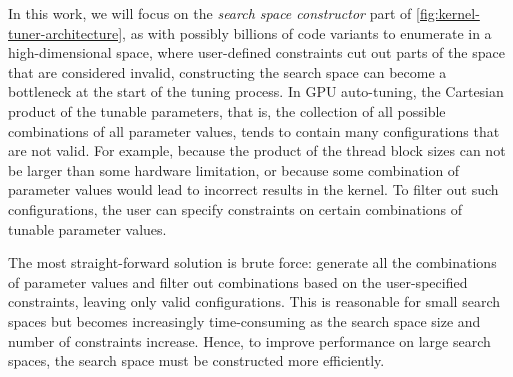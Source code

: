 

In this work, we will focus on the \textit{search space constructor} part of \cref{fig:kernel-tuner-architecture}, as with possibly billions of code variants to enumerate in a high-dimensional space, where user-defined constraints cut out parts of the space that are considered invalid, constructing the search space can become a bottleneck at the start of the tuning process. 
In GPU auto-tuning, the Cartesian product of the tunable parameters, that is, the collection of all possible combinations of all parameter values, tends to contain many configurations that are not valid. For example, because the product of the thread block sizes can not be larger than some hardware limitation, or because some combination of parameter values would lead to incorrect results in the kernel. To filter out such configurations, the user can specify constraints on certain combinations of tunable parameter values. 

The most straight-forward solution is brute force: generate all the combinations of parameter values and filter out combinations based on the user-specified constraints, leaving only valid configurations. This is reasonable for small search spaces but becomes increasingly time-consuming as the search space size and number of constraints increase.
Hence, to improve performance on large search spaces, the search space must be constructed more efficiently. 

